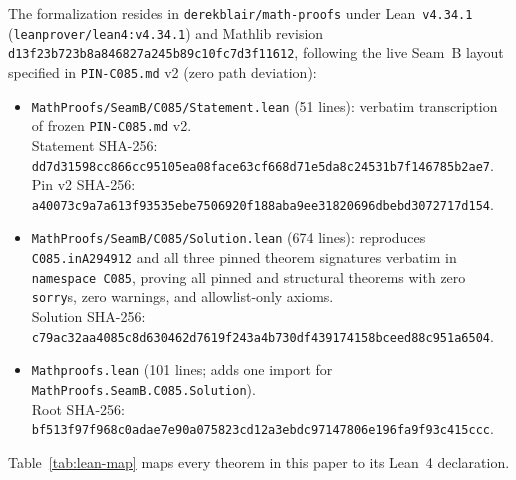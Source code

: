 \documentclass[11pt]{article}
\theoremstyle{definition}
\begin{document}
The formalization resides in \texttt{derekblair/math-proofs} under Lean~\texttt{v4.34.1} (\nolinkurl{leanprover/lean4:v4.34.1}) and Mathlib revision {\small\nolinkurl{d13f23b723b8a846827a245b89c10fc7d3f11612}}, following the live Seam~B layout specified in \texttt{PIN-C085.md} v2 (zero path deviation):
\begin{itemize}\setlength{\itemsep}{2pt}
\item \nolinkurl{MathProofs/SeamB/C085/Statement.lean} (51 lines): verbatim transcription of frozen \texttt{PIN-C085.md} v2.\\
Statement SHA-256: {\small\nolinkurl{dd7d31598cc866cc95105ea08face63cf668d71e5da8c24531b7f146785b2ae7}}.\\
Pin v2 SHA-256: {\small\nolinkurl{a40073c9a7a613f93535ebe7506920f188aba9ee31820696dbebd3072717d154}}.
\item \nolinkurl{MathProofs/SeamB/C085/Solution.lean} (674 lines): reproduces \texttt{C085.inA294912} and all three pinned theorem signatures verbatim in \texttt{namespace C085}, proving all pinned and structural theorems with zero \texttt{sorry}s, zero warnings, and allowlist-only axioms.\\
Solution SHA-256: {\small\nolinkurl{c79ac32aa4085c8d630462d7619f243a4b730df439174158bceed88c951a6504}}.
\item \nolinkurl{Mathproofs.lean} (101 lines; adds one import for \nolinkurl{MathProofs.SeamB.C085.Solution}).\\
Root SHA-256: {\small\nolinkurl{bf513f97f968c0adae7e90a075823cd12a3ebdc97147806e196fa9f93c415ccc}}.
\end{itemize}

Table~\ref{tab:lean-map} maps every theorem in this paper to its Lean~4 declaration.
\end{document}
